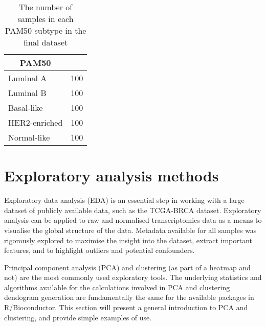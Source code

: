     
                \begin{table}[!htbp]
                \centering
                \caption{The number of samples in each PAM50 subtype in the final dataset}
                \label{pam50counts}
                \begin{tabular}{ll}
                \multicolumn{1}{c}{\textbf{PAM50}} &  \\ \hline
                \multicolumn{1}{|l|}{Luminal A} & \multicolumn{1}{l|}{100} \\ \hline
                \multicolumn{1}{|l|}{Luminal B} & \multicolumn{1}{l|}{100} \\ \hline
                \multicolumn{1}{|l|}{Basal-like} & \multicolumn{1}{l|}{100} \\ \hline
                \multicolumn{1}{|l|}{HER2-enriched} & \multicolumn{1}{l|}{100} \\ \hline
                \multicolumn{1}{|l|}{Normal-like} & \multicolumn{1}{l|}{100} \\ \hline
                \end{tabular}
                \end{table}
                
    
    
    
\section{Exploratory analysis methods}
    
    Exploratory data analysis (EDA) is an essential step in working with a large dataset of publicly available data, such as the TCGA-BRCA dataset. Exploratory analysis can be applied to raw and normalised transcriptomics data as a means to visualise the global structure of the data. Metadata available for all samples was rigorously explored to maximise the insight into the dataset, extract important features, and to highlight outliers and potential confounders.
    
    Principal component analysis (PCA) and clustering (as part of a heatmap and not) are the most commonly used exploratory tools. The underlying statistics and algorithms available for the calculations involved in PCA and clustering dendogram generation are fundamentally the same for the available packages in R/Bioconductor. This section will present a general introduction to PCA and clustering, and provide simple examples of use.

